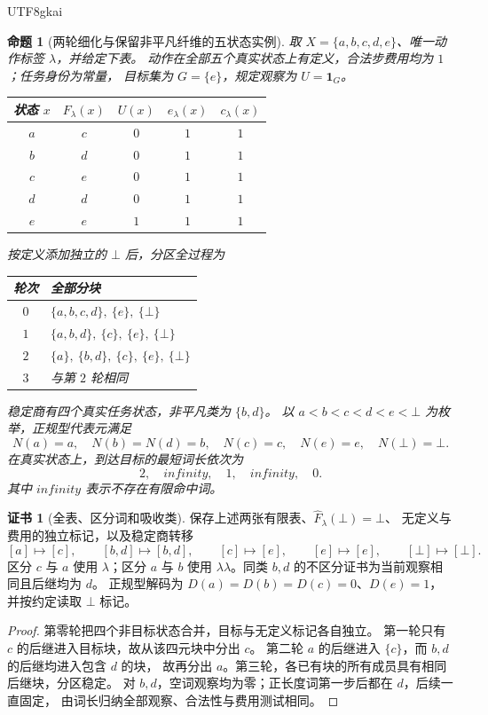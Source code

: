 \documentclass[12pt,a4paper,openany,notitlepage]{report}
\theoremstyle{plain}
\newtheorem{proposition}[theorem]{命题}
\theoremstyle{definition}
\newtheorem*{certificate}{证书}
\theoremstyle{remark}
\def\infty{infinity}\def\Gamma{Gamma}\def\Phi{Phi}%
\begin{document}
\begin{CJK*}{UTF8}{gkai}
\begin{proposition}[两轮细化与保留非平凡纤维的五状态实例]
\label{exp:gov:five-state}
取 $X=\{a,b,c,d,e\}$、唯一动作标签 $\lambda$，并给定下表。
动作在全部五个真实状态上有定义，合法步费用均为 $1$；任务身份为常量，
目标集为 $G=\{e\}$，规定观察为 $U=\mathbf1_G$。
\begin{center}
\begin{tabular}{ccccc}
\toprule
状态 $x$ & $F_\lambda(x)$ & $U(x)$ & $e_\lambda(x)$ & $c_\lambda(x)$\\
\midrule
$a$ & $c$ & $0$ & $1$ & $1$\\
$b$ & $d$ & $0$ & $1$ & $1$\\
$c$ & $e$ & $0$ & $1$ & $1$\\
$d$ & $d$ & $0$ & $1$ & $1$\\
$e$ & $e$ & $1$ & $1$ & $1$\\
\bottomrule
\end{tabular}
\end{center}
按定义添加独立的 $\bot$ 后，分区全过程为
\begin{center}
\begin{tabular}{cl}
\toprule
轮次 & 全部分块\\
\midrule
$0$ & $\{a,b,c,d\},\ \{e\},\ \{\bot\}$\\
$1$ & $\{a,b,d\},\ \{c\},\ \{e\},\ \{\bot\}$\\
$2$ & $\{a\},\ \{b,d\},\ \{c\},\ \{e\},\ \{\bot\}$\\
$3$ & 与第 $2$ 轮相同\\
\bottomrule
\end{tabular}
\end{center}
稳定商有四个真实任务状态，非平凡类为 $\{b,d\}$。
以 $a<b<c<d<e<\bot$ 为枚举，正规型代表元满足
\[
 N(a)=a,\quad N(b)=N(d)=b,\quad N(c)=c,\quad N(e)=e,
 \quad N(\bot)=\bot.
\]
在真实状态上，到达目标的最短词长依次为
\[
 2,\quad\infty,\quad1,\quad\infty,\quad0.
\]
其中 $\infty$ 表示不存在有限命中词。
\end{proposition}
\begin{certificate}[全表、区分词和吸收类]
保存上述两张有限表、$\widehat F_\lambda(\bot)=\bot$、
无定义与费用的独立标记，以及稳定商转移
\[
 [a]\mapsto[c],\qquad [b,d]\mapsto[b,d],\qquad
 [c]\mapsto[e],\qquad[e]\mapsto[e],\qquad[\bot]\mapsto[\bot].
\]
区分 $c$ 与 $a$ 使用 $\lambda$；区分 $a$ 与 $b$ 使用
$\lambda\lambda$。同类 $b,d$ 的不区分证书为当前观察相同且后继均为 $d$。
正规型解码为 $D(a)=D(b)=D(c)=0$、$D(e)=1$，并按约定读取 $\bot$ 标记。
\end{certificate}
\begin{proof}
第零轮把四个非目标状态合并，目标与无定义标记各自独立。
第一轮只有 $c$ 的后继进入目标块，故从该四元块中分出 $c$。
第二轮 $a$ 的后继进入 $\{c\}$，而 $b,d$ 的后继均进入包含 $d$ 的块，
故再分出 $a$。第三轮，各已有块的所有成员具有相同后继块，分区稳定。
对 $b,d$，空词观察均为零；正长度词第一步后都在 $d$，后续一直固定，
由词长归纳全部观察、合法性与费用测试相同。


\end{proof}
\end{CJK*}
\end{document}
